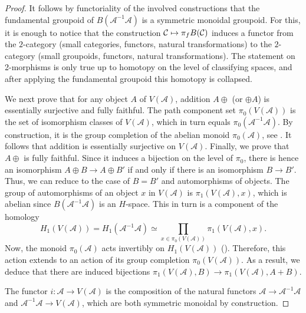 \documentclass[JEP,XML,SOM,Unicode,published]{cedram}
\newcommand\mto{\mathchoice{\longmapsto}{\mapsto}{\mapsto}{\mapsto}}
\theoremstyle{plain}
\theoremstyle{definition}
\newcommand{\Acal}{\mathcal A}
\newcommand{\Ccal}{\mathcal C}
\begin{document}
\begin{proof}
It follows by functoriality of the involved constructions that the fundamental groupoid of $B(\Acal^{-1} \Acal)$ is a symmetric monoidal groupoid. For this, it is enough to notice that the construction $\Ccal\mto \pi_{f}B(\Ccal)$ induces a functor from the $2$-category (small categories, functors, natural transformations) to the $2$-category (small groupoids, functors, natural transformations). The statement on 2-morphisms is only true up to homotopy on the level of classifying spaces, and after applying the fundamental groupoid this homotopy is collapsed.

We next prove that for any object $A$ of $V(\Acal)$, addition $A \oplus$ (or $\oplus A$) is essentially surjective and fully faithful. The path component set $\pi_0(V(\Acal))$ is the set of isomorphism classes of $V(\Acal)$, which in turn equals $\pi_{0}(\Acal^{-1}\Acal)$. By construction, it is the group completion of the abelian monoid $\pi_0(\Acal)$, see \cite[Lem.\,13.3.4]{Richter}. It follows that addition is essentially surjective on $V(\Acal)$. Finally, we prove that $A \oplus$ is fully faithful. Since it induces a bijection on the level of $\pi_0$, there is hence an isomorphism $A \oplus B \to A \oplus B'$ if and only if there is an isomorphism $B \to B'$. Thus, we can reduce to the case of $B = B'$ and automorphisms of objects. The group of automorphisms of an object $x$ in $V(\Acal)$ is $\pi_1(V(\Acal), x)$, which is abelian since $B(\Acal^{-1} \Acal)$ is an $H$-space. This in turn is a component of the homology
\begin{displaymath}
H_{1}(V(\Acal))=H_{1}(\Acal^{-1}\Acal)\simeq\prod_{x\in\pi_{0}(V(\Acal))}\pi_{1}(V(\Acal),x).
\end{displaymath}
Now, the monoid $\pi_{0}(\Acal)$ acts invertibly on $H_{1}(V(\Acal))$ (\cf \cite[p.\,221]{Grayson}). Therefore, this action extends to an action of its group completion $\pi_0(V(\Acal))$. As a result, we deduce that there are induced bijections $\pi_1(V(\Acal), B) \to \pi_1(V(\Acal), A+B)$.

The functor $i: \Acal \to V(\Acal)$ is the composition of the natural functors $\Acal \to \Acal^{-1}\Acal$ and $\Acal^{-1}\Acal\to V(\Acal)$, which are both symmetric monoidal by construction.


\end{proof}
\end{document}
